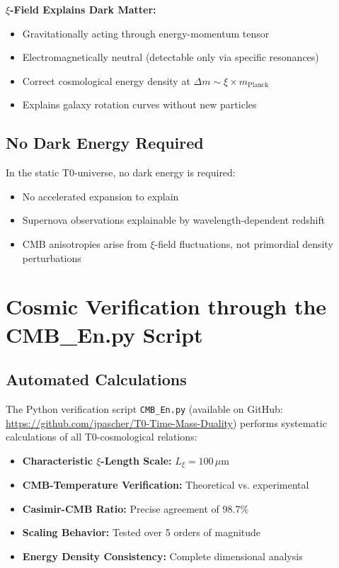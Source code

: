 \documentclass[12pt,a4paper]{article}
\newcommand{\xipar}{\xi}
\newcommand{\Lxi}{L_\xi}
\begin{document}
	\begin{keyresult}
		\textbf{$\xi$-Field Explains Dark Matter:}
		
		\begin{itemize}
			\item Gravitationally acting through energy-momentum tensor
			\item Electromagnetically neutral (detectable only via specific resonances)
			\item Correct cosmological energy density at $\Delta m \sim \xipar \times m_{\text{Planck}}$
			\item Explains galaxy rotation curves without new particles
		\end{itemize}
	\end{keyresult}
	
	\subsection{No Dark Energy Required}
	
	In the static T0-universe, no dark energy is required:
	
	\begin{itemize}
		\item No accelerated expansion to explain
		\item Supernova observations explainable by wavelength-dependent redshift
		\item CMB anisotropies arise from $\xi$-field fluctuations, not primordial density perturbations
	\end{itemize}
	
	\section{Cosmic Verification through the CMB\_En.py Script}
	
	\subsection{Automated Calculations}
	
	The Python verification script \texttt{CMB\_En.py} (available on GitHub: \url{https://github.com/jpascher/T0-Time-Mass-Duality}) performs systematic calculations of all T0-cosmological relations:
	
	\begin{itemize}
		\item \textbf{Characteristic $\xi$-Length Scale:} $\Lxi = 100\,\mu\text{m}$
		\item \textbf{CMB-Temperature Verification:} Theoretical vs. experimental
		\item \textbf{Casimir-CMB Ratio:} Precise agreement of 98.7\%
		\item \textbf{Scaling Behavior:} Tested over 5 orders of magnitude
		\item \textbf{Energy Density Consistency:} Complete dimensional analysis
	\end{itemize}
	
\end{document}
